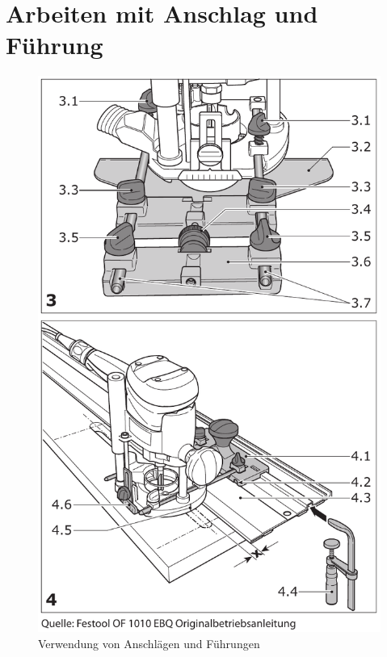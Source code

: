 \documentclass{\basedir/fablab-document}
\begin{document}
\section{Arbeiten mit Anschlag und Führung}
\begin{figure}[h!]
    \centering
    \includegraphics{bilder/fuehrung-sketch}
    \caption{Verwendung von Anschlägen und Führungen}
    \label{fig:drehzahl}
\end{figure}
\end{document}
